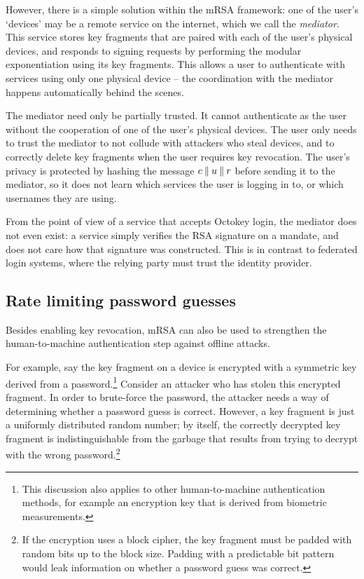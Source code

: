 However, there is a simple solution within the mRSA framework: one of the user's `devices' may be a
remote service on the internet, which we call the \emph{mediator}. This service stores key fragments
that are paired with each of the user's physical devices, and responds to signing requests by
performing the modular exponentiation using its key fragments. This allows a user to authenticate
with services using only one physical device -- the coordination with the mediator happens
automatically behind the scenes.

The mediator need only be partially trusted. It cannot authenticate as the user without the
cooperation of one of the user's physical devices. The user only needs to trust the mediator to not
collude with attackers who steal devices, and to correctly delete key fragments when the user
requires key revocation. The user's privacy is protected by hashing the message $c \mathbin{\|} u \mathbin{\|} r$
before sending it to the mediator, so it does not learn which services the user is logging in to,
or which usernames they are using.

From the point of view of a service that accepts Octokey login, the mediator does not even exist: a
service simply verifies the RSA signature on a mandate, and does not care how that signature was
constructed. This is in contrast to federated login systems, where the relying party must trust the
identity provider.

\subsection{Rate limiting password guesses}\label{sec:ratelimit}

Besides enabling key revocation, mRSA can also be used to strengthen the human-to-machine
authentication step against offline attacks.

For example, say the key fragment on a device is encrypted with a symmetric key derived from a
password.\footnote{This discussion also applies to other human-to-machine authentication methods,
for example an encryption key that is derived from biometric measurements.} Consider an attacker who
has stolen this encrypted fragment. In order to brute-force the password, the attacker needs a way
of determining whether a password guess is correct. However, a key fragment is just a uniformly
distributed random number; by itself, the correctly decrypted key fragment is indistinguishable from
the garbage that results from trying to decrypt with the wrong password.\footnote{If the encryption
uses a block cipher, the key fragment must be padded with random bits up to the block size. Padding
with a predictable bit pattern would leak information on whether a password guess was correct.}

